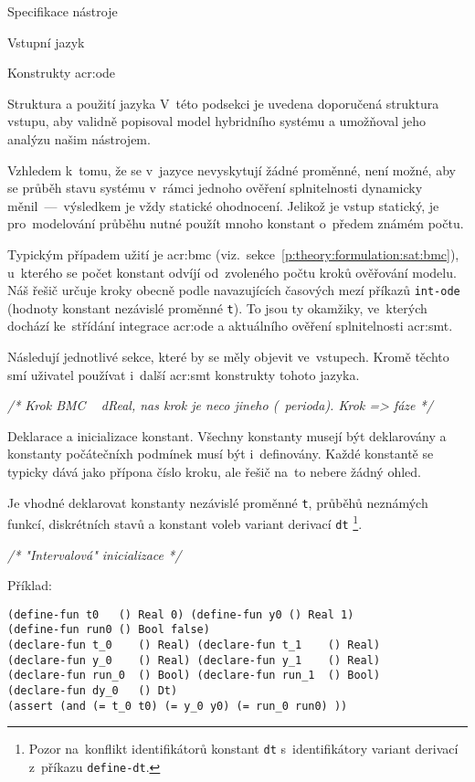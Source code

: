 \documentclass[thesis=M,czech]{FITthesis}[2012/06/26]
\newcommand{\acrlabel}[1]{acr:#1}
\newcommand{\acr}[1]{\acrshort{\acrlabel{#1}}}
\newcommand{\cmt}[1]{\textit{/* #1 */}}
\newcommand{\id}[1]{\texttt{#1}}
\newcommand{\rf}[1]{\ref{#1}}
\begin{document}
\begin{section}{Specifikace nástroje}
\begin{subsection}{Vstupní jazyk}
\begin{subsubsection}{Konstrukty \acr{ode}}

\end{subsubsection} %


\begin{subsubsection}{Struktura a použití jazyka}
\label{sss:design:spec:ilang:struct}
V~této podsekci je uvedena doporučená struktura vstupu,
aby validně popisoval model hybridního systému
a umožňoval jeho analýzu našim nástrojem.

Vzhledem k~tomu, že se v~jazyce nevyskytují žádné proměnné,
není možné, aby se průběh stavu systému
v~rámci jednoho ověření splnitelnosti
dynamicky měnil~---~výsledkem je vždy statické ohodnocení.
Jelikož je vstup statický,
je pro~modelování průběhu nutné použít mnoho konstant
o~předem známém počtu.

Typickým případem užití je \acr{bmc}
(viz.~sekce~\rf{p:theory:formulation:sat:bmc}),
u~kterého se počet konstant odvíjí od~zvoleného počtu kroků
ověřování modelu.
Náš řešič určuje kroky obecně
podle navazujících časových mezí příkazů \id{int-ode}
(hodnoty konstant nezávislé proměnné \id{t}).
To jsou ty okamžiky, ve~kterých dochází ke~střídání
integrace \acr{ode} a aktuálního ověření splnitelnosti \acr{smt}.

Následují jednotlivé sekce,
které by se měly objevit ve~vstupech.
Kromě těchto smí uživatel používat
i~další \acr{smt} konstrukty tohoto jazyka.

\cmt{Krok BMC ~ dReal, nas krok je neco jineho (~perioda).
Krok => fáze}


\begin{paragraph}{Deklarace a inicializace konstant.}
\label{p:design:spec:ilang:struct:const}
Všechny konstanty musejí být deklarovány a konstanty
počátečníxh podmínek
musí být i~definovány.
Každé konstantě se typicky dává jako přípona číslo kroku,
ale řešič na~to nebere žádný ohled.

Je vhodné deklarovat konstanty
nezávislé proměnné \id{t},
průběhů neznámých funkcí, diskrétních stavů
a konstant voleb variant derivací \id{dt}%
\footnote{Pozor na~konflikt identifikátorů konstant \id{dt}
s~identifikátory variant derivací
z~příkazu \id{define\--dt}.}.

\cmt{"Intervalová" inicializace}

Příklad:
\begin{verbatim}
(define-fun t0   () Real 0) (define-fun y0 () Real 1)
(define-fun run0 () Bool false)
(declare-fun t_0    () Real) (declare-fun t_1    () Real)
(declare-fun y_0    () Real) (declare-fun y_1    () Real)
(declare-fun run_0  () Bool) (declare-fun run_1  () Bool)
(declare-fun dy_0   () Dt)
(assert (and (= t_0 t0) (= y_0 y0) (= run_0 run0) ))
\end{verbatim}
\end{paragraph} %


\end{subsubsection}
\end{subsection}
\end{section}
\end{document}
